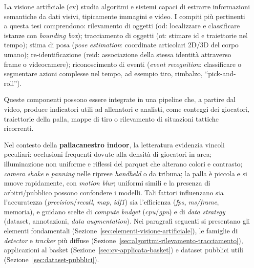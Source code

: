 \documentclass[12pt,a4paper,openright,twoside]{book}
\begin{document}
La visione artificiale (\ac{cv}) studia algoritmi e sistemi capaci 
di estrarre informazioni semantiche da dati visivi, tipicamente immagini e video. 
I compiti più pertinenti a questa tesi comprendono: rilevamento di oggetti
(\ac{od}: localizzare e classificare istanze con \emph{bounding box});
tracciamento di oggetti (\ac{ot}: stimare \ac{id} e traiettorie nel tempo);
stima di posa (\emph{pose estimation}: coordinate articolari 2D/3D del corpo umano); 
re-identificazione (\ac{reid}: associazione della stessa identità attraverso frame o videocamere); 
riconoscimento di eventi (\emph{event recognition}: classificare o segmentare azioni 
complesse nel tempo, ad esempio tiro, rimbalzo, ``pick-and-roll'').

Queste componenti possono essere integrate in una pipeline che, 
a partire dal video, produce indicatori utili ad allenatori e analisti, 
come conteggi dei giocatori, traiettorie della palla, mappe di tiro o 
rilevamento di situazioni tattiche ricorrenti.

Nel contesto della \textbf{pallacanestro indoor}, la letteratura 
evidenzia vincoli peculiari: occlusioni frequenti dovute alla 
densità di giocatori in area; illuminazione non uniforme e 
riflessi del parquet che alterano colori e contrasto; 
\emph{\emph{camera shake}} e \emph{panning} nelle riprese 
\emph{handheld} o da tribuna; la palla è piccola e si muove 
rapidamente, con \emph{motion blur}; uniformi simili e la 
presenza di arbitri/pubblico possono confondere i modelli. 
Tali fattori influenzano sia l'accuratezza 
(\emph{precision}/\emph{recall}, \emph{\ac{map}}, \emph{\ac{idf1}}) 
sia l'efficienza (\emph{\ac{fps}}, \emph{ms/frame}, memoria), 
e guidano scelte di \emph{compute budget} 
(\emph{\ac{cpu}}/\emph{\ac{gpu}}) e di \emph{data strategy} 
(dataset, annotazioni, \emph{data augmentation}). 
Nei paragrafi seguenti si presentano gli elementi 
fondamentali (Sezione~\ref{sec:elementi-visione-artificiale}), 
le famiglie di \emph{detector} e \emph{tracker} più diffuse 
(Sezione~\ref{sec:algoritmi-rilevamento-tracciamento}), 
applicazioni al basket (Sezione~\ref{sec:cv-applicata-basket})
e dataset pubblici utili (Sezione~\ref{sec:dataset-pubblici}).


\end{document}
